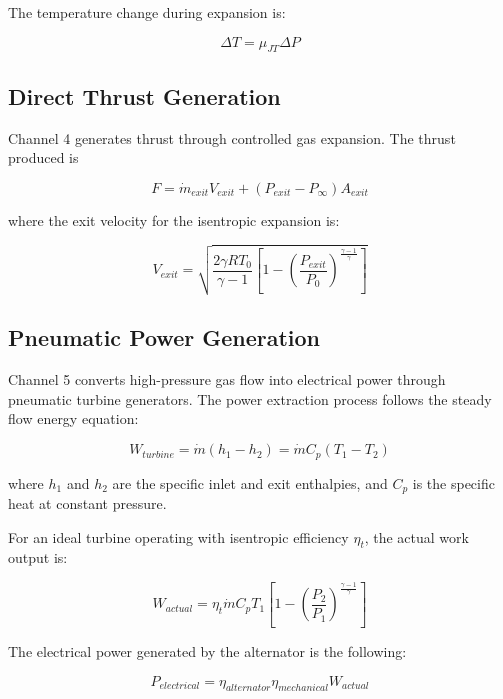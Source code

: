 \documentclass[12pt,a4paper]{article}
\begin{document}
The temperature change during expansion is:

\begin{equation}
\Delta T = \mu_{JT} \Delta P
\end{equation}

\subsection{Direct Thrust Generation}

Channel 4 generates thrust through controlled gas expansion. The thrust produced is

\begin{equation}
F = \dot{m}_{exit} V_{exit} + (P_{exit} - P_\infty) A_{exit}
\end{equation}

where the exit velocity for the isentropic expansion is:

\begin{equation}
V_{exit} = \sqrt{\frac{2\gamma RT_0}{\gamma-1}\left[1 - \left(\frac{P_{exit}}{P_0}\right)^{\frac{\gamma-1}{\gamma}}\right]}
\end{equation}

\subsection{Pneumatic Power Generation}

Channel 5 converts high-pressure gas flow into electrical power through pneumatic turbine generators. The power extraction process follows the steady flow energy equation:

\begin{equation}
W_{turbine} = \dot{m}\left(h_1 - h_2\right) = \dot{m}C_p(T_1 - T_2)
\end{equation}

where $h_1$ and $h_2$ are the specific inlet and exit enthalpies, and $C_p$ is the specific heat at constant pressure.

For an ideal turbine operating with isentropic efficiency $\eta_t$, the actual work output is:

\begin{equation}
W_{actual} = \eta_t \dot{m}C_p T_1 \left[1 - \left(\frac{P_2}{P_1}\right)^{\frac{\gamma-1}{\gamma}}\right]
\end{equation}

The electrical power generated by the alternator is the following:

\begin{equation}
P_{electrical} = \eta_{alternator} \eta_{mechanical} W_{actual}
\end{equation}
\end{document}
